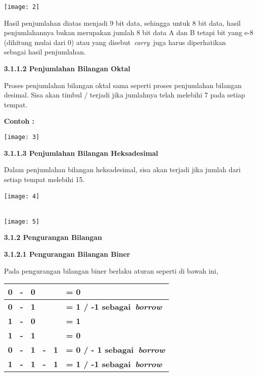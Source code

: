 \documentclass[11pt,fleqn]{book} %
\begin{document}
\begin{myEnumerate}
\begin{itemize}
\begin{center}
\noindent \texttt{[image: 2]}
\end{center}

\noindent 

\noindent Hasil penjumlahan diatas menjadi 9 bit data, sehingga untuk 8 bit data, hasil penjumlahannya bukan merupakan jumlah 8 bit data A dan B tetapi bit yang e-8 (dihitung mulai dari 0) atau yang disebut~\textit{carry}~juga harus diperhatikan~ sebagai hasil penjumlahan.

\noindent \textbf{3.1.1.2 Penjumlahan Bilangan Oktal}

Proses penjumlahan bilangan oktal sama seperti proses penjumlahan bilangan desimal. Sisa akan timbul / terjadi jika jumlahnya telah melebihi 7 pada setiap tempat.

\noindent \textbf{Contoh :}

\begin{center}
\noindent \texttt{[image: 3]}
\end{center}

\noindent 

\noindent \textbf{3.1.1.3 Penjumlahan Bilangan Heksadesimal}

Dalam penjumlahan bilangan heksadesimal, sisa akan terjadi jika jumlah dari setiap tempat melebihi 15.

\begin{center}
\noindent \texttt{[image: 4]}~ ~ ~ ~ ~ ~ ~ ~ ~ ~ ~ ~ ~ ~ ~ ~ ~ ~ ~ ~ ~ ~ ~ ~ ~ ~ ~ ~ ~ ~ ~ ~ ~ ~ ~ ~ ~ ~ ~ ~ ~ ~ ~ ~~
\end{center}

\noindent 

\begin{center}
\noindent \texttt{[image: 5]}
\end{center}

\noindent 

\noindent \textbf{3.1.2 Pengurangan Bilangan}

\noindent \textbf{3.1.2.1 Pengurangan Bilangan Biner}

Pada pengurangan bilangan biner berlaku aturan seperti di bawah ini,

\begin{center}
\begin{tabular}{|p{0.9in}|p{1.3in}|} \hline 
\textbf{0~ -~ 0} & \textbf{= 0} \\ \hline 
\textbf{0~ -~ 1} & \textbf{= 1 / -1 sebagai~\textit{borrow}} \\ \hline 
\textbf{1~ -~ 0} & \textbf{= 1} \\ \hline 
\textbf{1~ -~ 1} & \textbf{= 0} \\ \hline 
\textbf{0~ -~ 1~ -~ 1} & \textbf{= 0 / - 1 sebagai~\textit{borrow}} \\ \hline 
\textbf{1~ -~ 1~ -~ 1} & \textbf{= 1 / -1 sebagai~\textit{borrow}} \\ \hline 
\end{tabular}
\end{center}


\end{itemize}
\end{myEnumerate}
\end{document}
